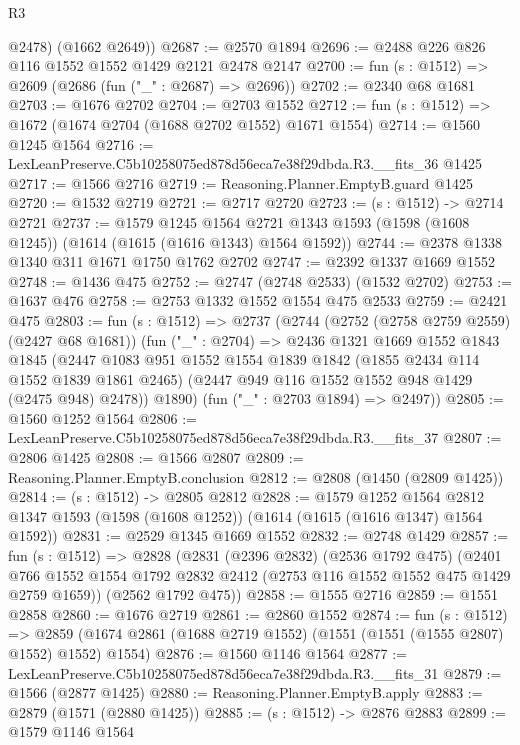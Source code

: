 \begin{lexlean}{R3}
\begin{coremodule}
        @2478)
      (@1662 @2649))
@2687 := @2570 @1894
@2696 := @2488 @226 @826 @116 @1552 @1552 @1429 @2121 @2478 @2147
@2700 := fun (s : @1512) => @2609 (@2686 (fun ("_" : @2687) => @2696))
@2702 := @2340 @68 @1681
@2703 := @1676 @2702
@2704 := @2703 @1552
@2712 := fun (s : @1512) => @1672 (@1674 @2704 (@1688 @2702 @1552) @1671 @1554)
@2714 := @1560 @1245 @1564
@2716 := LexLeanPreserve.C5b10258075ed878d56eca7e38f29dbda.R3.__fits_36 @1425
@2717 := @1566 @2716
@2719 := Reasoning.Planner.EmptyB.guard @1425
@2720 := @1532 @2719
@2721 := @2717 @2720
@2723 := (s : @1512) -> @2714 @2721
@2737 := @1579
    @1245
    @1564
    @2721
    @1343
    @1593
    (@1598 (@1608 @1245))
    (@1614 (@1615 (@1616 @1343) @1564 @1592))
@2744 := @2378 @1338 @1340 @311 @1671 @1750 @1762 @2702
@2747 := @2392 @1337 @1669 @1552
@2748 := @1436 @475
@2752 := @2747 (@2748 @2533) (@1532 @2702)
@2753 := @1637 @476
@2758 := @2753 @1332 @1552 @1554 @475 @2533
@2759 := @2421 @475
@2803 := fun (s : @1512) =>
  @2737
    (@2744
      (@2752 (@2758 @2759 @2559) (@2427 @68 @1681))
      (fun ("_" : @2704) =>
      @2436
        @1321
        @1669
        @1552
        @1843
        @1845
        (@2447
          @1083
          @951
          @1552
          @1554
          @1839
          @1842
          (@1855 @2434 @114 @1552 @1839 @1861 @2465)
          (@2447 @949 @116 @1552 @1552 @948 @1429 (@2475 @948) @2478))
        @1890)
      (fun ("_" : @2703 @1894) => @2497))
@2805 := @1560 @1252 @1564
@2806 := LexLeanPreserve.C5b10258075ed878d56eca7e38f29dbda.R3.__fits_37
@2807 := @2806 @1425
@2808 := @1566 @2807
@2809 := Reasoning.Planner.EmptyB.conclusion
@2812 := @2808 (@1450 (@2809 @1425))
@2814 := (s : @1512) -> @2805 @2812
@2828 := @1579
    @1252
    @1564
    @2812
    @1347
    @1593
    (@1598 (@1608 @1252))
    (@1614 (@1615 (@1616 @1347) @1564 @1592))
@2831 := @2529 @1345 @1669 @1552
@2832 := @2748 @1429
@2857 := fun (s : @1512) =>
  @2828
    (@2831
      (@2396 @2832)
      (@2536 @1792 @475)
      (@2401 @766 @1552 @1554 @1792 @2832 @2412 (@2753 @116 @1552 @1552 @475 @1429 @2759 @1659))
      (@2562 @1792 @475))
@2858 := @1555 @2716
@2859 := @1551 @2858
@2860 := @1676 @2719
@2861 := @2860 @1552
@2874 := fun (s : @1512) =>
  @2859 (@1674 @2861 (@1688 @2719 @1552) (@1551 (@1551 (@1555 @2807) @1552) @1552) @1554)
@2876 := @1560 @1146 @1564
@2877 := LexLeanPreserve.C5b10258075ed878d56eca7e38f29dbda.R3.__fits_31
@2879 := @1566 (@2877 @1425)
@2880 := Reasoning.Planner.EmptyB.apply
@2883 := @2879 (@1571 (@2880 @1425))
@2885 := (s : @1512) -> @2876 @2883
@2899 := @1579
    @1146
    @1564

\end{coremodule}
\end{lexlean}
